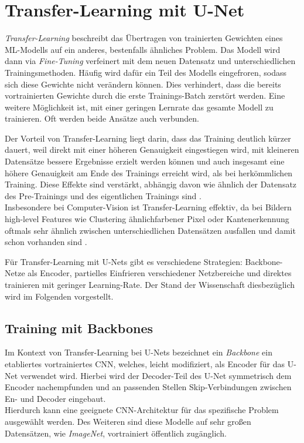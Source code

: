 \section{Transfer-Learning mit U-Net}

\textit{Transfer-Learning} beschreibt das Übertragen von trainierten Gewichten eines \ac{ML}-Modells auf ein anderes, 
bestenfalls ähnliches Problem. Das Modell wird dann via \textit{Fine-Tuning} verfeinert mit dem neuen Datensatz und unterschiedlichen Trainingsmethoden.
Häufig wird dafür ein Teil des Modells eingefroren, sodass sich diese Gewichte nicht verändern können. Dies verhindert, 
dass die bereits vortrainierten Gewichte durch die erste Trainings-Batch zerstört werden. Eine weitere Möglichkeit ist,
mit einer geringen Lernrate das gesamte Modell zu trainieren. Oft werden beide Ansätze auch verbunden.

Der Vorteil von Transfer-Learning liegt darin, dass das Training deutlich kürzer dauert, 
weil direkt mit einer höheren Genauigkeit eingestiegen wird, mit kleineren Datensätze bessere Ergebnisse erzielt werden können
 und auch insgesamt eine höhere Genauigkeit 
am Ende des Trainings erreicht wird, als bei herkömmlichen Training. Diese Effekte sind verstärkt, 
abhängig davon wie ähnlich der Datensatz des Pre-Trainings und des eigentlichen Trainings sind \cite{Ruder.3212017}. \\
Insbesondere bei Computer-Vision ist Transfer-Learning effektiv, da bei Bildern high-level Features wie Clustering 
ähnlichfarbener Pixel oder Kantenerkennung oftmals sehr ähnlich zwischen unterschiedlichen Datensätzen ausfallen 
und damit schon vorhanden sind \cite{Ruder.3212017}. 

Für Transfer-Learning mit U-Nets gibt es verschiedene Strategien: Backbone-Netze als Encoder, 
partielles Einfrieren verschiedener Netzbereiche und direktes trainieren mit geringer Learning-Rate.
Der Stand der Wissenschaft diesbezüglich wird im Folgenden vorgestellt. 

\subsection{Training mit Backbones}

Im Kontext von Transfer-Learning bei U-Nets bezeichnet ein \textit{Backbone} ein etabliertes vortrainiertes \ac{CNN}, 
welches, leicht modifiziert, als Encoder für das U-Net verwendet wird. Hierbei wird der Decoder-Teil des U-Net 
symmetrisch dem Encoder nachempfunden und an passenden Stellen Skip-Verbindungen zwischen En- und Decoder eingebaut. \\
Hierdurch kann eine geeignete \ac{CNN}-Architektur für das spezifische Problem ausgewählt werden. Des Weiteren sind diese 
Modelle auf sehr großen Datensätzen, wie \textit{ImageNet}, vortrainiert öffentlich zugänglich. 

